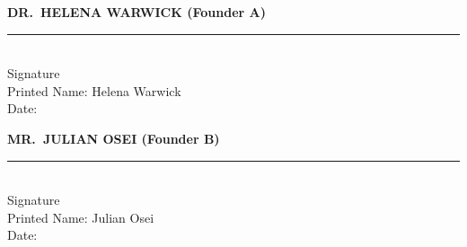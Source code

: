 \par\bigskip

\noindent
\begin{minipage}[t]{0.47\textwidth}
  \begin{tcolorbox}[notebox, top=10pt, bottom=14pt]
    \textbf{\small DR.\ HELENA WARWICK (Founder A)}\\[6pt]
    \noindent\rule{\linewidth}{0.4pt}\\[2pt]
    {\small Signature}\\[2pt]
    {\small\color{NavyMid}Printed Name: Helena Warwick}\\[2pt]
    {\small\color{NavyMid}Date: \underline{\hspace{4.6cm}}}
  \end{tcolorbox}
\end{minipage}%
\hfill
\begin{minipage}[t]{0.47\textwidth}
  \begin{tcolorbox}[notebox, top=10pt, bottom=14pt]
    \textbf{\small MR.\ JULIAN OSEI (Founder B)}\\[6pt]
    \noindent\rule{\linewidth}{0.4pt}\\[2pt]
    {\small Signature}\\[2pt]
    {\small\color{NavyMid}Printed Name: Julian Osei}\\[2pt]
    {\small\color{NavyMid}Date: \underline{\hspace{4.6cm}}}
  \end{tcolorbox}
\end{minipage}

\par\bigskip

